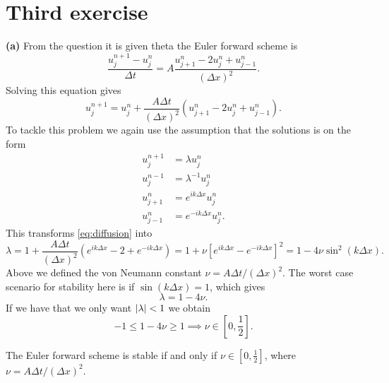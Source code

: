 \section{Third exercise}
\textbf{(a)} From the question it is given theta the Euler forward scheme is 
\begin{equation}
    \frac{u^{n+1}_j - u^n_j}{\Delta t} = A \frac{u^n_{j+1} - 2u^n_j + u^n_{j-1}}{(\Delta x)^2}.
    \label{eq:diffusion}
\end{equation}  
Solving this equation gives 
\begin{equation*}
    u^{n+1}_j = u^n_j + \frac{A\Delta t}{\left(\Delta x\right)^2} \left( u^n_{j+1} - 2u^n_j + u^n_{j-1}\right).
\end{equation*}
To tackle this problem we again use the assumption that the solutions is on the form
\begin{align*}
    u_j^{n+1} &= \lambda u_j^n \\ 
    u_j^{n-1} &= \lambda^{-1} u_j^n \\
    u_{j+1}^n &= e^{ik\Delta x} u_j^n \\ 
    u_{j-1}^n &= e^{-ik\Delta x} u_j^n.
\end{align*}
This transforms \autoref{eq:diffusion} into
\begin{equation}
    \lambda = 1 + \frac{A\Delta t}{\left(\Delta x\right)^2}\left(e^{ik\Delta x}-2+e^{-ik\Delta x} \right)= 1+\nu\left[e^{ik\Delta x}-e^{-ik\Delta x}\right]^2=1-4\nu\sin^2(k\Delta x).
\end{equation}
Above we defined the von Neumann constant $\nu=A\Delta t/{\left(\Delta x\right)^2}$. The worst case scenario for stability here is if $\sin(k\Delta x)=1$, which gives 
\begin{equation*}
    \lambda = 1- 4\nu.
\end{equation*}
If we have that we only want $\left| \lambda \right| <1$ we obtain 
\begin{equation*}
    -1\leq 1- 4\nu\geq1 \implies \nu \in \left[0,\frac{1}{2}\right].
\end{equation*}

\begin{answer}
    The Euler forward scheme is stable if and only if $\nu \in \left[0,\frac{1}{2}\right]$, where $\nu=A\Delta t/{\left(\Delta x\right)^2}$. 
\end{answer}

